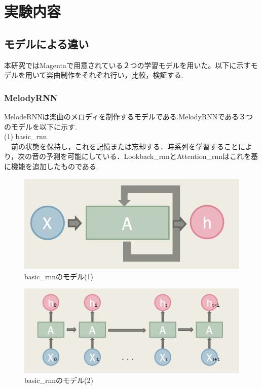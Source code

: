 \chapter{実験内容}
\section{モデルによる違い}
本研究ではMagentaで用意されている２つの学習モデルを用いた。以下に示すモデルを用いて楽曲制作をそれぞれ行い，比較，検証する.
\subsection{MelodyRNN}
MelodeRNNは楽曲のメロディを制作するモデルである.MelodyRNNである３つのモデルを以下に示す.\\
(1) basic\_rnn\\
　前の状態を保持し，これを記憶または忘却する．時系列を学習することにより，次の音の予測を可能にしている．Lookback\_rnnとAttention\_rnnはこれを基に機能を追加したものである.
\begin{figure}[!ht]
    \begin{screen}
    \begin{center}
        \includegraphics[scale=1.4,clip]{./img/basic3.png}
        \caption{basic\_rnnのモデル(1)}
        \label{fig:basicrnnのモデル(1)}
    \end{center}
    \end{screen}
\end{figure}
\newpage
\begin{figure}[!ht]
    \begin{screen}
    \begin{center}
        \includegraphics[scale=0.9,clip]{./img/basic4.png}
        \caption{basic\_rnnのモデル(2)}
        \label{fig:basic_rnnのモデル(2)}
    \end{center}
    \end{screen}
\end{figure}
